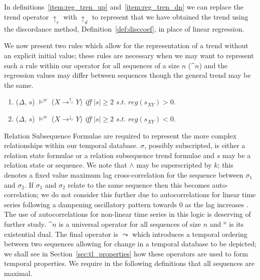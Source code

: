 In definitions~\ref{item:reg_tren_up} and~\ref{item:reg_tren_dn} we
can replace the trend operator $\uparrow_r$ with $\uparrow_d$ to
represent that we have obtained the trend using the discordance
method, Definition~\ref{def:disccoef}, in place of linear regression.

We now present two rules which allow for the representation of a trend
without an explicit initial value; these rules are necessary when we
may want to represent such a rule within our operator for all
sequences of a size $n$ ($\bm^n$) and the regression values may differ
between sequences though the general trend may be the same.

\begin{enumerate}

\item\label{item:tren_up}($\Delta$, $s$) $\models^w$ ($X
\to^{\uparrow_r} Y$) { \em iff } $\mid s \mid \ge 2$ $s.t.$
 $reg(s_{XY}) > 0$.


\item\label{item:tren_dn}($\Delta$, $s$) $\models^w$ ($X
\to^{\downarrow_r} Y$) { \em iff } $\mid s \mid \ge 2$ $s.t.$
 $reg(s_{XY}) < 0$.

\end{enumerate}


Relation Subsequence Formulae are required to represent the more
complex relationships within our temporal database. $\sigma$, possibly
subscripted, is either a relation state formulae or a relation
subsequence trend formulae and $s$ may be a relation state or
sequence. We note that $\wedge$ may be superscripted by $k$; this
denotes a fixed value maximum lag cross-correlation for the sequence
between $\sigma_1$ and $\sigma_2$. If $\sigma_1$ and $\sigma_2$ relate
to the same sequence then this becomes auto-correlation; we do not
consider this further due to autocorrelations for linear time series
following a dampening oscillatory pattern towards 0 as the lag
increases \cite{end95}. The use of autocorrelations for non-linear
time series in this logic is deserving of further study. $\bm^n$ is a
universal operator for all sequences of size $n$ and \diam$^n$ is its
existential dual. The final operator is $\leadsto$ which introduces a
temporal ordering between two sequences allowing for change in a
temporal database to be depicted; we shall see in
Section~\ref{sec:tl_properties} how these operators are used to form
temporal properties. We require in the following definitions that all
sequences are maximal.

